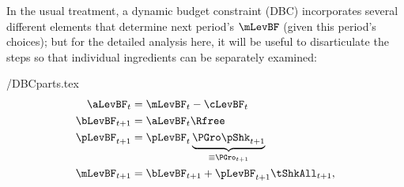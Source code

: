 \documentclass[BufferStockTheory]{subfiles}
\begin{document}
In the usual treatment, a dynamic budget constraint (DBC) incorporates
several different elements that determine next period's $\mLevBF$ (given this
period's choices); but for the detailed analysis here, it will be useful to
disarticulate the steps so that individual ingredients can be separately examined:
\begin{verbatimwrite}{\EqDir/DBCparts.tex}
  \begin{equation}\begin{gathered}\begin{aligned}
    \aLevBF_{t}    & = \mLevBF_{t}-\cLevBF_{t}  \label{eq:DBCparts} \\
    \bLevBF_{t+1}    & = \aLevBF_{t} \Rfree \notag \\
    \pLevBF_{t+1}  & = \pLevBF_{t} \underbrace{\PGro\pShk_{t+1}}_{\equiv \PGro_{t+1}}  \notag \\
    \mLevBF_{t+1}  & =  \bLevBF_{t+1} +\pLevBF_{t+1}\tShkAll_{t+1},  \notag
  \end{aligned}\end{gathered}\end{equation}
\end{verbatimwrite}
\end{document}
